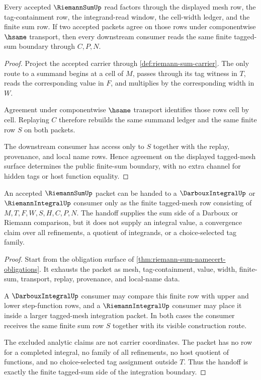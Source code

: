 \begin{theorem}
\label{thm:riemann-sum-tagged-mesh-exactness}
Every accepted $\RiemannSumUp$ read factors through the displayed mesh row, the tag-containment row, the integrand-read window, the cell-width ledger, and the finite sum row. If two accepted packets agree on those rows under componentwise $\hsame$ transport, then every downstream consumer reads the same finite tagged-sum boundary through $C,P,N$.
\end{theorem}
\begin{proof}
Project the accepted carrier through \autoref{def:riemann-sum-carrier}. The only route to a summand begins at a cell of $M$, passes through its tag witness in $T$, reads the corresponding value in $F$, and multiplies by the corresponding width in $W$.

Agreement under componentwise $\hsame$ transport identifies those rows cell by cell. Replaying $C$ therefore rebuilds the same summand ledger and the same finite row $S$ on both packets.

The downstream consumer has access only to $S$ together with the replay, provenance, and local name rows. Hence agreement on the displayed tagged-mesh surface determines the public finite-sum boundary, with no extra channel for hidden tags or host function equality.
\end{proof}

\begin{theorem}
\label{thm:riemann-sum-darboux-handoff}
An accepted $\RiemannSumUp$ packet can be handed to a $\DarbouxIntegralUp$ or $\RiemannIntegralUp$ consumer only as the finite tagged-mesh row consisting of $M,T,F,W,S,H,C,P,N$. The handoff supplies the sum side of a Darboux or Riemann comparison, but it does not supply an integral value, a convergence claim over all refinements, a quotient of integrands, or a choice-selected tag family.
\end{theorem}
\begin{proof}
Start from the obligation surface of \autoref{thm:riemann-sum-namecert-obligations}. It exhausts the packet as mesh, tag-containment, value, width, finite-sum, transport, replay, provenance, and local-name data.

A $\DarbouxIntegralUp$ consumer may compare this finite row with upper and lower step-function rows, and a $\RiemannIntegralUp$ consumer may place it inside a larger tagged-mesh integration packet. In both cases the consumer receives the same finite sum row $S$ together with its visible construction route.

The excluded analytic claims are not carrier coordinates. The packet has no row for a completed integral, no family of all refinements, no host quotient of functions, and no choice-selected tag assignment outside $T$. Thus the handoff is exactly the finite tagged-sum side of the integration boundary.
\end{proof}

